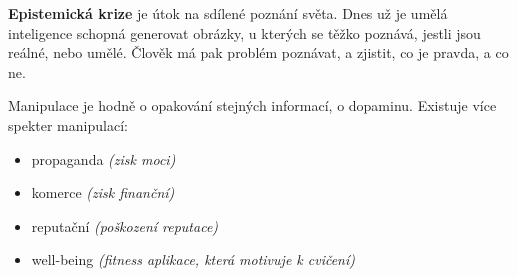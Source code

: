 \textbf{Epistemická krize} je útok na sdílené poznání světa. Dnes už je umělá inteligence schopná generovat obrázky, u kterých se těžko poznává, jestli jsou reálné, nebo umělé. Člověk má pak problém poznávat, a zjistit, co je pravda, a co ne.

\begin{quote}
\end{quote}

Manipulace je hodně o opakování stejných informací, o dopaminu. Existuje více spekter manipulací:

\begin{itemize}
    \item propaganda \textit{(zisk moci)}
    \item komerce \textit{(zisk finanční)}
    \item reputační \textit{(poškození reputace)}
    \item well-being \textit{(fitness aplikace, která motivuje k cvičení)}
\end{itemize}
